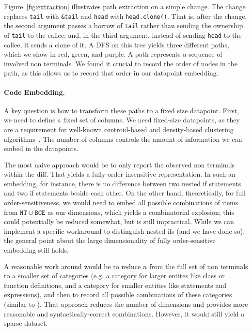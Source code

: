 Figure~\ref{fig:extraction} illustrates path extraction on a simple change. The change replaces \verb+tail+ with \verb+&tail+ and \verb+head+ with \verb+head.clone()+. That is, after the change, the second argument passes a borrow of \verb+tail+ rather than sending the ownership of \verb+tail+ to the callee; and, in the third argument, instead of sending \verb+head+ to the callee, it sends a clone of it. A DFS on this tree yields three different paths, which we show in red, green, and purple. A path represents a sequence of involved non terminals. We found it crucial to record the order of nodes in the path, as this allows us to record that order in our datapoint embedding.

\paragraph{Code Embedding.} A key question is how to transform these paths to a fixed size datapoint. First, we need to define a fixed set of columns. We need fixed-size datapoints, as they are a requirement for well-known centroid-based and density-based clustering algorithms~\citep{xu2005survey}. The number of columns controls the amount of information we can embed in the datapoints. 

The most naive approach would be to only report the observed non terminals within the diff. That yields a fully order-insensitive representation. In such an embedding, for instance, there is no difference between two nested if statements and two if statements beside each other. On the other hand, theoretically, for full order-sensitiveness, we would need to embed all possible combinations of items from $\mathtt{NT} \cup \mathtt{BCE}$ as our dimensions, which yields a combinatorial explosion; this could potentially be reduced somewhat, but is still impractical. While we can implement a specific workaround to distinguish nested ifs (and we have done so), the general point about the large dimensionality of fully order-sensitive embedding still holds.

A reasonable work around would be to reduce $n$ from the full set of non terminals to a smaller set of categories (e.g. a category for larger entites like class or function definitions, and a category for smaller entities like statements and expressions), and then to record all possible combinations of these categories (similar to \cite{hanam2016discovering}). That approach reduces the number of dimensions and provides more reasonable and syntactically-correct combinations. However, it would still yield a sparse dataset. 

